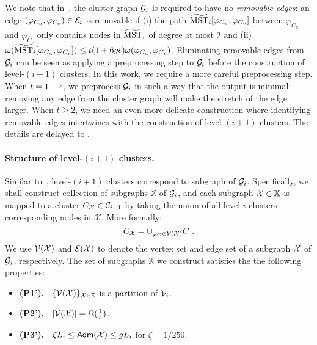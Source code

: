 We note that in~\cite{LS21}, the cluster graph $\mathcal{G}_i$ is required to have no \emph{removable edges}:  an edge $(\varphi_{C_u},\varphi_{C_v}) \in \mathcal{E}_i$ is removable if (i) the path $\widetilde{\mathrm{MST}}_i[\varphi_{C_u},\varphi_{C_v}]$ between $\varphi_{C_u}$ and $\varphi_{C_v}$ only contains nodes in $\widetilde{\mathrm{MST}}_{i}$ of degree at most $2$ and (ii) $\omega(\widetilde{\mathrm{MST}}_i[\varphi_{C_u},\varphi_{C_v}]) \leq t(1 + 6g\epsilon)\omega(\varphi_{C_u},\varphi_{C_v})$. Eliminating removable edges from $\mathcal{G}_i$ can be seen as applying a preprocessing step to $\mathcal{G}_i$ before the construction of level-$(i+1)$ clusters. In this work, we require a more careful preprocessing step. When $t = 1+\epsilon$, we preprocess $\mathcal{G}_i$ in such a way that the output is minimal: removing any edge from the cluster graph will make the stretch of the edge larger. When $t \geq 2$, we need an even more delicate construction where identifying removable edges intertwines with the construction of level-$(i+1)$ clusters.  The details are delayed to . 
 


\paragraph{Structure of level-$(i+1)$ clusters.~} Similar to~\cite{LS21}, level-$(i+1)$ clusters correspond to subgraph of $\mathcal{G}_i$. Specifically, we shall construct collection of subgraphs $\mathbb{X}$ of $\mathcal{G}_i$, and each subgraph $\mathcal{X}\in \mathbb{X}$ is mapped to a cluster $C_{\mathcal{X}} \in \mathcal{C}_{i+1}$ by taking the union of all level-$i$ clusters corresponding nodes in $\mathcal{X}$. More formally:
\begin{equation}\label{eq:XtoCluster}
	C_{\mathcal{X}}  = \cup_{\varphi_C\in \mathcal{V}(\mathcal{X})} C~.
\end{equation}
We use $\mathcal{V}(\mathcal{X})$ and $\mathcal{E}(\mathcal{X})$ to denote the vertex set and edge set of a subgraph $\mathcal{X}$ of $\mathcal{G}_i$, respectively. The set of subgraphs $\mathbb{X}$ we construct satisfies the the following properties:

\begin{itemize}[noitemsep]
	\item \textbf{(P1').~} \hypertarget{P1'}{}  $\{\mathcal{V}(\mathcal{X})\}_{\mathcal{X} \in \mathbb{X}}$ is a partition of $\mathcal{V}_i$.
	\item \textbf{(P2').~} \hypertarget{P2'}{} $|\mathcal{V}(\mathcal{X})| = \Omega(\frac{1}{\epsilon})$.
	\item \textbf{(P3').~} \hypertarget{P3'}{} $\zeta L_i \leq \mathsf{Adm}(\mathcal{X}) \leq gL_{i}$ for $\zeta = 1/250$.
\end{itemize}

